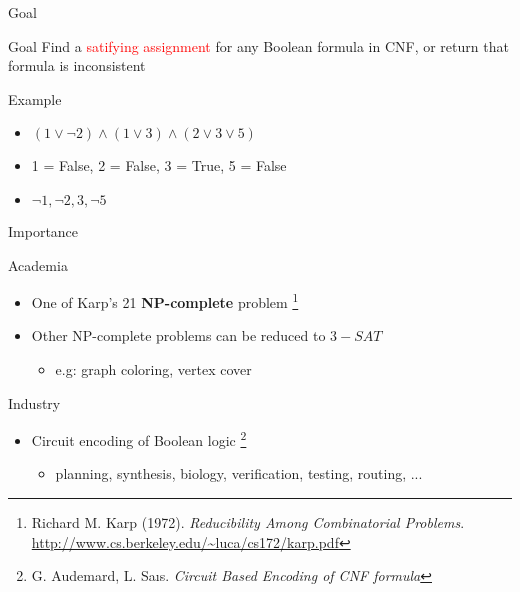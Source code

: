 \documentclass[mathserif,serif]{beamer}
\begin{document}
\begin{frame}{Goal}
  \begin{block}{Goal}
    \centering \large
    Find a \textcolor{red}{satifying assignment} for any Boolean formula
    in CNF, or return that formula is inconsistent
  \end{block}

  \begin{block}{Example}
    \begin{itemize}
      \item $(1 \lor \neg 2) \land (1 \lor 3) \land (2 \lor 3 \lor 5)$
      \item 1 = False, 2 = False, 3 = True, 5 = False
      \item $\neg 1, \neg 2, 3, \neg 5$
    \end{itemize}
  \end{block}
\end{frame}

\begin{frame}{Importance}
  \begin{block}{Academia}
    \begin{itemize}
      \item One of Karp's 21 \textbf{NP-complete} problem
      \footnote{Richard M. Karp (1972). \emph{Reducibility Among Combinatorial Problems}. \url{http://www.cs.berkeley.edu/~luca/cs172/karp.pdf}}
      \item Other NP-complete problems can be reduced to $3-SAT$
      \begin{itemize}
        \item e.g: graph coloring, vertex cover
      \end{itemize}
    \end{itemize}
  \end{block}

  \begin{block}{Industry}
    \begin{itemize}
      \item Circuit encoding of Boolean logic
      \footnote{G. Audemard, L. Saıs. \emph{Circuit Based Encoding of CNF formula}}
      \begin{itemize}
        \item planning, synthesis, biology, verification, testing, routing, ...
      \end{itemize}
    \end{itemize}
  \end{block}
\end{frame}
\end{document}
